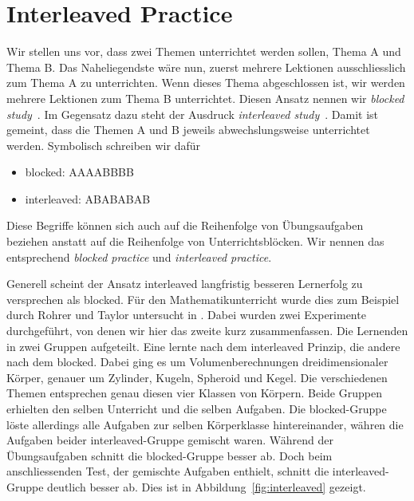 \section{Interleaved Practice}
Wir stellen uns vor, dass zwei Themen unterrichtet werden sollen, Thema A und Thema B.
Das Naheliegendste wäre nun, zuerst mehrere Lektionen ausschliesslich zum Thema A zu unterrichten.
Wenn dieses Thema abgeschlossen ist, wir werden mehrere Lektionen zum Thema B unterrichtet.
Diesen Ansatz nennen wir \textit{blocked study}~\cite{Carvalho2014}.
Im Gegensatz dazu steht der Ausdruck \textit{interleaved study}~\cite{Carvalho2014}.
Damit ist gemeint, dass die Themen A und B jeweils abwechslungsweise unterrichtet werden.
Symbolisch schreiben wir dafür
\begin{itemize}
	\item blocked: AAAABBBB
	\item interleaved: ABABABAB
\end{itemize}
Diese Begriffe können sich auch auf die Reihenfolge von Übungsaufgaben beziehen anstatt auf die Reihenfolge von Unterrichtsblöcken.
Wir nennen das entsprechend \textit{blocked practice} und \textit{interleaved practice}.

Generell scheint der Ansatz \glqq{}interleaved\grqq{} langfristig besseren Lernerfolg zu versprechen als \glqq{}blocked\grqq{}.
Für den Mathematikunterricht wurde dies zum Beispiel durch Rohrer und Taylor untersucht in \cite{Rohrer2007}.
Dabei wurden zwei Experimente durchgeführt, von denen wir hier das zweite kurz zusammenfassen.
Die Lernenden in zwei Gruppen aufgeteilt.
Eine lernte nach dem \glqq{}interleaved\grqq{} Prinzip, die andere nach dem \glqq{}blocked\grqq{}.
Dabei ging es um Volumenberechnungen dreidimensionaler Körper, genauer um Zylinder, Kugeln, Spheroid und Kegel.
Die verschiedenen Themen entsprechen genau diesen vier Klassen von Körpern.
Beide Gruppen erhielten den selben Unterricht und die selben Aufgaben.
Die \glqq{}blocked\grqq{}-Gruppe löste allerdings alle Aufgaben zur selben Körperklasse hintereinander, währen die Aufgaben beider \glqq{}interleaved\grqq{}-Gruppe gemischt waren.
Während der Übungsaufgaben schnitt die \glqq{}blocked\grqq{}-Gruppe besser ab.
Doch beim anschliessenden Test, der gemischte Aufgaben enthielt, schnitt die \glqq{}interleaved\grqq{}-Gruppe deutlich besser ab.
Dies ist in Abbildung~\ref{fig:interleaved} gezeigt.

